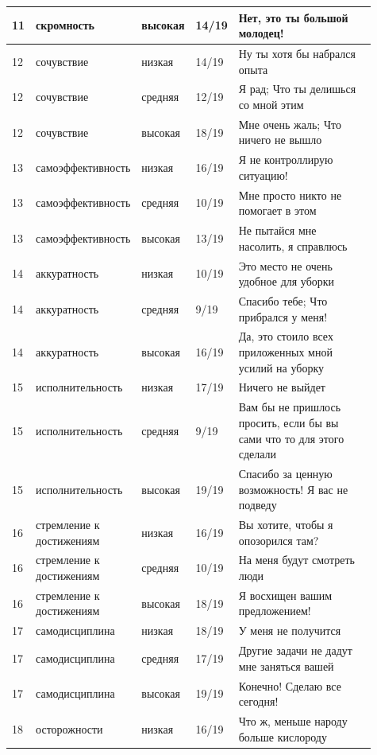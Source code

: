 \begin{landscape}
\begin{longtable}{|p{0.06\linewidth}|p{0.2\linewidth}|p{0.11\linewidth}|p{0.08\linewidth}|p{0.46\linewidth}|}
		\hline
		11 & скромность & высокая & 14/19 & Нет, это ты большой молодец! \\
		\hline
		12 & сочувствие & низкая & 14/19 & Ну ты хотя бы набрался опыта \\
		\hline
		12 & сочувствие & средняя & 12/19 & Я рад; Что ты делишься со мной этим \\
		\hline
		12 & сочувствие & высокая & 18/19 & Мне очень жаль; Что ничего не вышло \\
		\hline
		13 & самоэффективность & низкая & 16/19 & Я не контроллирую ситуацию! \\
		\hline
		13 & самоэффективность & средняя & 10/19 & Мне просто никто не помогает в этом \\
		\hline
		13 & самоэффективность & высокая & 13/19 & Не пытайся мне насолить, я справлюсь \\
		\hline
		14 & аккуратность & низкая & 10/19 & Это место не очень удобное для уборки \\
		\hline
		14 & аккуратность & средняя & 9/19 & Спасибо тебе; Что прибрался у меня! \\
		\hline
		14 & аккуратность & высокая & 16/19 & Да, это стоило всех приложенных мной усилий на уборку \\
		\hline
		15 & исполнительность & низкая & 17/19 & Ничего не выйдет \\
		\hline
		15 & исполнительность & средняя & 9/19 & Вам бы не пришлось просить, если бы вы сами что то для этого сделали \\
		\hline
		15 & исполнительность & высокая & 19/19 & Спасибо за ценную возможность! Я вас не подведу \\
		\hline
		16 & стремление к достижениям & низкая & 16/19 & Вы хотите, чтобы я опозорился там? \\
		\hline
		16 & стремление к достижениям & средняя & 10/19 & На меня будут смотреть люди \\
		\hline
		16 & стремление к достижениям & высокая & 18/19 & Я восхищен вашим предложением! \\
		\hline
		17 & самодисциплина & низкая & 18/19 & У меня не получится \\
		\hline
		17 & самодисциплина & средняя & 17/19 & Другие задачи не дадут мне заняться вашей \\
		\hline
		17 & самодисциплина & высокая & 19/19 & Конечно! Сделаю все сегодня! \\
		\hline
		18 & осторожности & низкая & 16/19 & Что ж, меньше народу больше кислороду \\

\end{longtable}
\end{landscape}
